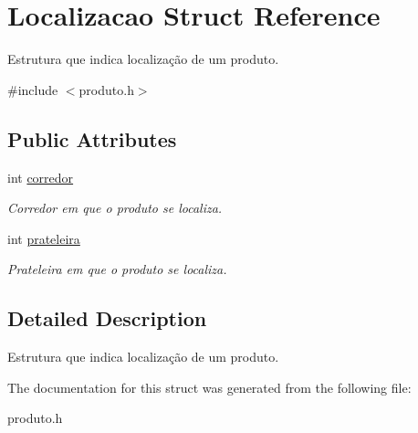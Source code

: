 \hypertarget{structLocalizacao}{}\section{Localizacao Struct Reference}
\label{structLocalizacao}


Estrutura que indica localização de um produto.  




{\ttfamily \#include $<$produto.\+h$>$}

\subsection*{Public Attributes}
\begin{DoxyCompactItemize}
\item 
\mbox{\label{structLocalizacao_a8f08c9a49397df0aacd64d2fb0c2ec99}} 
int \hyperlink{structLocalizacao_a8f08c9a49397df0aacd64d2fb0c2ec99}{corredor}
\begin{DoxyCompactList}\small\item\em Corredor em que o produto se localiza. \end{DoxyCompactList}\item 
\mbox{\label{structLocalizacao_a1c64d7b4458175c202ce31bad058bb97}} 
int \hyperlink{structLocalizacao_a1c64d7b4458175c202ce31bad058bb97}{prateleira}
\begin{DoxyCompactList}\small\item\em Prateleira em que o produto se localiza. \end{DoxyCompactList}\end{DoxyCompactItemize}


\subsection{Detailed Description}
Estrutura que indica localização de um produto. 

The documentation for this struct was generated from the following file\+:\begin{DoxyCompactItemize}
\item 
produto.\+h\end{DoxyCompactItemize}
